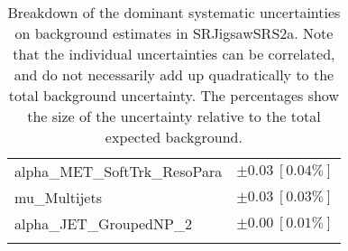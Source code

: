\begin{table}
\begin{center}
\begin{tabular*}{\textwidth}{@{\extracolsep{\fill}}lc}
alpha\_MET\_SoftTrk\_ResoPara         & $\pm 0.03\ [0.04\%] $       \\
mu\_Multijets         & $\pm 0.03\ [0.03\%] $       \\
alpha\_JET\_GroupedNP\_2         & $\pm 0.00\ [0.01\%] $       \\
\noalign{\smallskip}\hline\noalign{\smallskip}
\end{tabular*}
\end{center}
\caption[Breakdown of uncertainty on background estimates]{
Breakdown of the dominant systematic uncertainties on background estimates in SRJigsawSRS2a.
Note that the individual uncertainties can be correlated, and do not necessarily add up quadratically to 
the total background uncertainty. The percentages show the size of the uncertainty relative to the total expected background.
\label{table.results.bkgestimate.uncertainties.SRJigsawSRS2a}}
\end{table}
%
